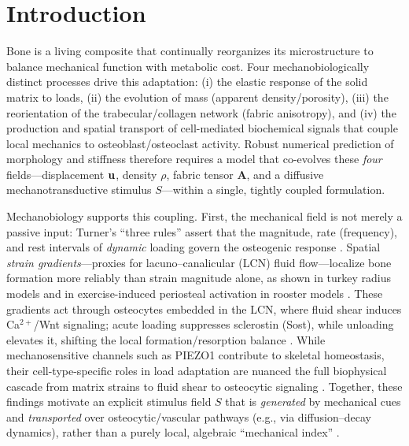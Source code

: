 \section*{Introduction}
\label{s:introduction}
Bone is a living composite that continually reorganizes its microstructure to balance mechanical function with metabolic cost. Four mechanobiologically distinct processes drive this adaptation: (i) the elastic response of the solid matrix to loads, (ii) the evolution of mass (apparent density/porosity), (iii) the reorientation of the trabecular/collagen network (fabric anisotropy), and (iv) the production and spatial transport of cell-mediated biochemical signals that couple local mechanics to osteoblast/osteoclast activity. Robust numerical prediction of morphology and stiffness therefore requires a model that co-evolves these \emph{four} fields---displacement $\mathbf{u}$, density $\rho$, fabric tensor $\mathbf{A}$, and a diffusive mechanotransductive stimulus $S$---within a single, tightly coupled formulation.

Mechanobiology supports this coupling. First, the mechanical field is not merely a passive input: Turner’s “three rules” assert that the magnitude, rate (frequency), and rest intervals of \emph{dynamic} loading govern the osteogenic response \cite{Turner1998_ThreeRulesBone}. Spatial \emph{strain gradients}---proxies for lacuno--canalicular (LCN) fluid flow---localize bone formation more reliably than strain magnitude alone, as shown in turkey radius models \cite{Gross1997_StrainGradientsCorrelate} and in exercise-induced periosteal activation in rooster models \cite{Zernicke1997_StrainGradientsCorrelate}. These gradients act through osteocytes embedded in the LCN, where fluid shear induces Ca$^{2+}$/Wnt signaling; acute loading suppresses sclerostin (Sost), while unloading elevates it, shifting the local formation/resorption balance \cite{Robling2008_MechanicalStimulationBone}. While mechanosensitive channels such as PIEZO1 contribute to skeletal homeostasis, their cell-type-specific roles in load adaptation are nuanced   the full biophysical cascade from matrix strains to fluid shear to osteocytic signaling \cite{Wang2020_MechanicalSensingProtein}. Together, these findings motivate an explicit stimulus field $S$ that is \emph{generated} by mechanical cues and \emph{transported} over osteocytic/vascular pathways (e.g., via diffusion--decay dynamics), rather than a purely local, algebraic ``mechanical index'' .

